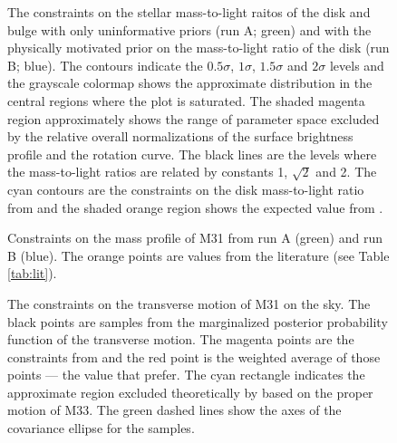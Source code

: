 \documentclass[preprint,12pt]{aastex}
\newcommand{\figlabel}[1]{\label{fig:#1}}
\newcommand{\tab}[1]{Table \ref{tab:#1}}
\begin{document}
\begin{figure}[tbp]
    \caption{The constraints on the stellar mass-to-light raitos of the disk
        and bulge with only uninformative priors (run A; green) and with the
        physically motivated prior on the mass-to-light ratio of the disk
        (run B; blue). The contours indicate the
        $0.5\sigma$, $1\sigma$, $1.5\sigma$ and $2\sigma$ levels and the
        grayscale colormap shows the approximate distribution in the central
        regions where the plot is saturated. The shaded magenta region
        approximately shows the range of parameter space excluded by the
        relative overall normalizations of the surface brightness profile
        and the rotation curve.
        The black lines are the levels where the mass-to-light ratios are
        related by constants 1, $\sqrt{2}$ and 2.
        The cyan contours are the constraints on the disk mass-to-light
        ratio from \citet{Bell:2003} and the shaded orange region shows the
        expected value from \citet{Courteau:1999a}.
        \figlabel{m2l}}
\end{figure}

\begin{figure}[tbp]
    \caption{Constraints on the mass profile of M31 from run A (green) and
    run B (blue). The orange points are values from the literature (see
    \tab{lit}).
    \figlabel{mass-profile}}
\end{figure}

\begin{figure}[tbp]
    \caption{\figlabel{m300}}
\end{figure}

\begin{figure}[tbp]
    \caption{The constraints on the transverse motion of M31 on the sky. The
        black points are samples from the marginalized posterior probability
        function of the transverse motion.
        The magenta points are the constraints from \citet{vdm} and the red
        point is the weighted average of those points --- the value that
        \citet{vdm} prefer. The cyan rectangle indicates the approximate
        region excluded theoretically by \citet{Loeb:2005} based on the
        proper motion of M33. The green dashed lines show the axes of the
        covariance ellipse for the samples. \figlabel{vt}}
\end{figure}
\end{document}
